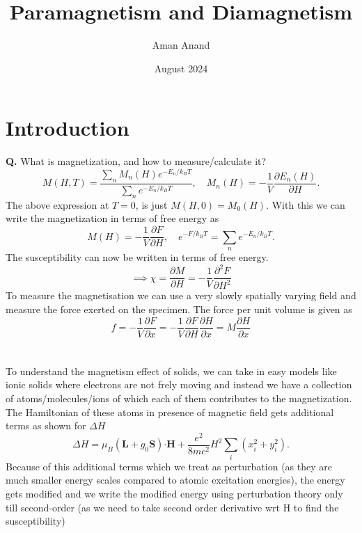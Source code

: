 \documentclass{article}
\title{Paramagnetism and Diamagnetism}
\author{Aman Anand}
\date{August 2024}
\begin{document}
	
	\maketitle
	
	\section{Introduction}
	\textbf{Q.} What is magnetization, and how to measure/calculate it? \\
	\begin{equation}
	M(H,T) = \frac{\sum_n M_n (H) e^{-E_n/k_BT}}{\sum_ne^{-E_n/k_BT}}, \quad M_n(H) = -\frac{1}{V}\frac{\partial E_n(H)}{\partial H}.
	\end{equation}
	The above expression at $T = 0$, is just $M(H,0) = M_0 (H)$.
	With this we can write the magnetization in terms of free energy as
	\begin{equation}
	M(H) = -\frac{1}{V}\frac{\partial F}{\partial H}, \quad e^{-F/k_BT} = \sum_ne^{-E_n/k_BT}.
	\end{equation}
	The susceptibility can now be written in terms of free energy.
	\begin{equation}
	\implies \chi = \frac{\partial M}{\partial H} = -\frac{1}{V}\frac{\partial^2 F}{\partial H^2}
	\end{equation}
	To measure the magnetisation we can use a very slowly spatially varying field and measure the force exerted on the specimen. The force per unit volume is given as
	\begin{equation}
	f = -\frac{1}{V}\frac{\partial F}{\partial x} = -\frac{1}{V}\frac{\partial F}{\partial H} \frac{\partial H}{\partial x} = M \frac{\partial H}{\partial x} 
	\end{equation}
\\\\
	To understand the magnetism effect of solids, we can take in easy models like ionic solids where electrons are not frely moving and instead we have a collection of atoms/molecules/ions of which each of them contributes to the magnetization. The Hamiltonian of these atoms in presence of magnetic field gets additional terms as shown for $\Delta H$
\begin{equation}
\Delta H = \mu_B (\mathbf{L}+ g_0 \mathbf{S})\mathbf{ \cdot} \mathbf{H} + \frac{e^2}{8mc^2} H^2 \sum_i (x_i ^2 + y_i ^2).
\end{equation}
Because of this additional terms which we treat as perturbation (as they are much smaller energy scales compared to atomic excitation energies), the energy gets modified and we write the modified energy using perturbation theory only till second-order (as we need to take second order derivative wrt H to find the susceptibility)
\end{document}
